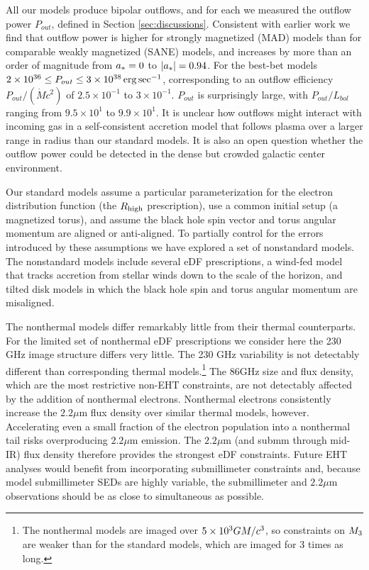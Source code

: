 All our models produce bipolar outflows, and for each we measured the outflow power $P_{out}$, defined in Section \ref{sec:discussions}. Consistent with earlier work we find that outflow power is higher for strongly magnetized (MAD) models than for comparable weakly magnetized (SANE) models, and increases by more than an order of magnitude from $a_* = 0$ to $|a_*| = 0.94$.  For the best-bet models $2 \times 10^{36} \le P_{out} \le 3 \times 10^{38} \,\mathrm{erg} \,\mathrm{sec}^{-1}$, corresponding to an outflow efficiency $P_{out}/(\dot{M} c^2)$ of $2.5\times10^{-1}$ to $3\times10^{-1}$.  $P_{out}$ is surprisingly large, with $P_{out}/L_{bol}$ ranging from $9.5\times10^{1}$ to $9.9\times10^{1}$.  It is unclear how outflows might interact with incoming gas in a self-consistent accretion model that follows plasma over a larger range in radius than our standard models.  It is also an open question whether the outflow power could be detected in the dense but crowded galactic center environment.

Our standard models assume a particular parameterization for the electron distribution function (the $R_\mathrm{high}$ prescription), use a common initial setup (a magnetized torus), and assume the black hole spin vector and torus angular momentum are aligned or anti-aligned.  To partially control for the errors introduced by these assumptions we have explored a set of nonstandard models.  The nonstandard models include several eDF prescriptions, a wind-fed model that tracks accretion from stellar winds down to the scale of the horizon, and tilted disk models in which the black hole spin and torus angular momentum are misaligned.

The nonthermal models differ remarkably little from their thermal counterparts.  For the limited set of nonthermal eDF prescriptions we consider here the 230 GHz image structure differs very little.  The 230 GHz variability is not detectably different than corresponding thermal models.\footnote{The nonthermal models are imaged over $5\times 10^3GM/c^3$, so constraints on $M_{3}$ are weaker than for the standard models, which are imaged for 3 times as long.} The 86GHz size and flux density, which are the most restrictive non-EHT constraints, are not detectably affected by the addition of nonthermal electrons.  Nonthermal electrons consistently increase the $2.2\mu$m flux density over similar thermal models, however.  Accelerating even a small fraction of the electron population into a nonthermal tail risks overproducing $2.2\mu$m emission.  The $2.2\mu$m (and submm through mid-IR) flux density therefore provides the strongest eDF constraints.  Future EHT analyses would benefit from incorporating submillimeter constraints \citep[e.g.]{2019ApJ...881L...2B} and, because model submillimeter SEDs are highly variable, the submillimeter and $2.2\mu$m observations should be as close to simultaneous as possible.   

